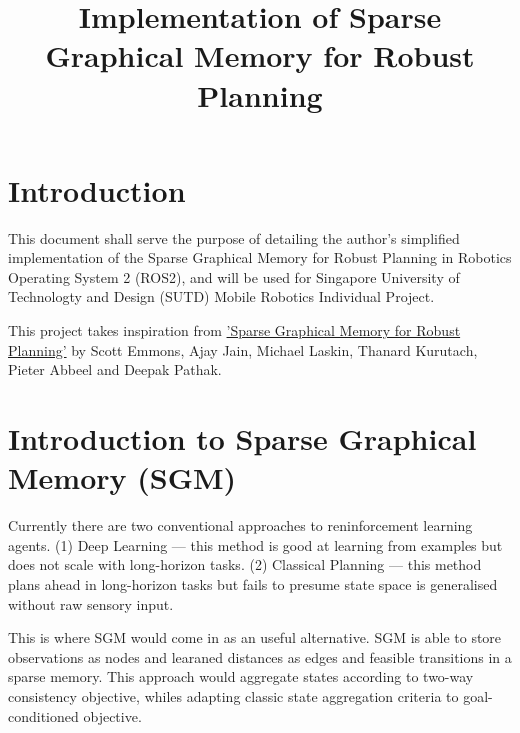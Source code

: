 \documentclass[conference]{IEEEtran}
\begin{document}
\title{Implementation of Sparse Graphical Memory for Robust Planning}

\author{
}

\maketitle

\section{Introduction}
This document shall serve the purpose of detailing the author's simplified implementation of the Sparse Graphical Memory for Robust Planning in Robotics Operating System 2 (ROS2), and will be used for Singapore University of Technologty and Design (SUTD) Mobile Robotics Individual Project.

This project takes inspiration from \href{https://paperswithcode.com/paper/sparse-graphical-memory-for-robust-planning}{'Sparse Graphical Memory for Robust Planning'} by Scott Emmons, Ajay Jain, Michael Laskin, Thanard Kurutach, Pieter Abbeel and Deepak Pathak.

\section{Introduction to Sparse Graphical Memory (SGM)}

Currently there are two conventional approaches to reninforcement learning agents. (1) Deep Learning --- this method is good at learning from examples but does not scale with long-horizon tasks. (2) Classical Planning --- this method plans ahead in long-horizon tasks but fails to presume state space is generalised without raw sensory input.

This is where SGM would come in as an useful alternative. SGM is able to store observations as nodes and learaned distances as edges and feasible transitions in a sparse memory. This approach would aggregate states according to two-way consistency objective, whiles adapting classic state aggregation criteria to goal-conditioned objective.
\end{document}
